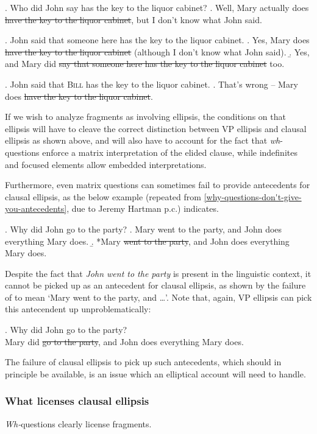 \documentclass[doublespace]{umthesis}
\begin{document}
\ex. 	Who did John say has the key to the liquor cabinet?
	\a. Well, Mary actually does \sout{have the key to the liquor cabinet}, but I don't know what John said.
	
\ex. 	John said that someone here has the key to the liquor cabinet.
	\a. Yes, Mary does \sout{have the key to the liquor cabinet} (although I don't know what John said).
	\b. Yes, and Mary did \sout{say that someone here has the key to the liquor cabinet} too.
	
\ex. 	John said that \textsc{Bill} has the key to the liquor cabinet.
	\a. That's wrong -- Mary does \sout{have the key to the liquor cabinet}.
	
If we wish to analyze fragments as involving ellipsis, the conditions on that ellipsis will have to cleave the correct distinction between VP ellipsis and clausal ellipsis as shown above, and will also have to account for the fact that 	{\it wh}-questions enforce a matrix interpretation of the elided clause, while indefinites and focused elements allow embedded interpretations.

Furthermore, even matrix questions can sometimes fail to provide antecedents for clausal ellipsis, as the below example (repeated from \ref{why-questions-don't-give-you-antecedents}, due to Jeremy Hartman p.c.) indicates.

\ex. 	Why did John go to the party?
	\a. Mary went to the party, and John does everything Mary does.
	\b. *Mary \sout{went to the party}, and John does everything Mary does.

Despite the fact that {\it John went to the party} is present in the linguistic context, it cannot be picked up as an antecedent for clausal ellipsis, as shown by the failure of \Last[b] to mean `Mary went to the party, and \ldots'. Note that, again, VP ellipsis can pick this antecendent up unproblematically:

\ex. 	Why did John go to the party?\\
	Mary did \sout{go to the party}, and John does everything Mary does.
	
The failure of clausal ellipsis to pick up such antecedents, which should in principle be available, is an issue which an elliptical account will need to handle. 

\subsubsection{What licenses clausal ellipsis}

{\it Wh-}questions clearly license fragments.
\end{document}
